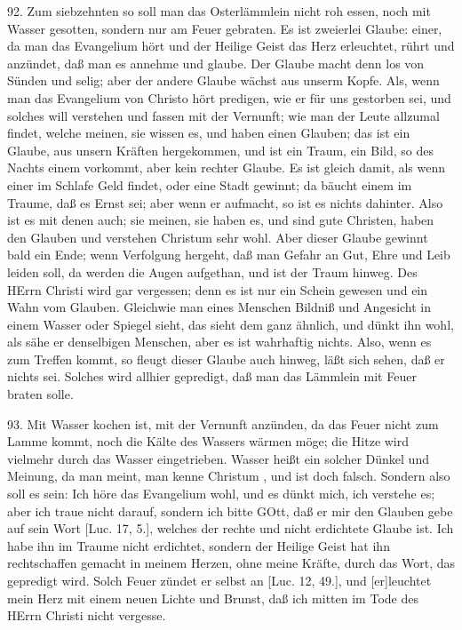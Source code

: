 92. Zum siebzehnten so soll man das Osterlämmlein nicht roh essen, noch mit Wasser gesotten, sondern nur am Feuer gebraten. Es ist zweierlei Glaube: einer, da man das Evangelium hört und der Heilige Geist das Herz erleuchtet, rührt und anzündet, daß man es annehme und glaube. Der Glaube macht denn los von Sünden und selig; aber der andere Glaube wächst aus unserm Kopfe. Als, wenn man das Evangelium von Christo hört predigen, wie er für uns gestorben sei, und solches will verstehen und fassen mit der Vernunft; wie man der Leute allzumal findet, welche meinen, sie wissen es, und haben einen Glauben; das ist ein Glaube, aus unsern Kräften hergekommen, und ist ein Traum, ein Bild, so des Nachts einem vorkommt, aber kein rechter Glaube. Es ist gleich damit, als wenn einer im Schlafe Geld findet, oder eine Stadt gewinnt; da bäucht einem im Traume, daß es Ernst sei; aber wenn er aufmacht, so ist es nichts dahinter. Also ist es mit denen auch; sie meinen, sie haben es, und sind gute Christen, haben den Glauben und verstehen Christum sehr wohl. Aber dieser Glaube gewinnt bald ein Ende; wenn Verfolgung hergeht, daß man Gefahr an Gut, Ehre und Leib leiden soll, da werden die Augen aufgethan, und ist der Traum hinweg. Des HErrn Christi wird gar vergessen; denn es ist nur ein Schein gewesen und ein Wahn vom Glauben. Gleichwie man eines Menschen Bildniß und Angesicht in einem Wasser oder Spiegel sieht, das sieht dem ganz ähnlich, und dünkt ihn wohl, als sähe er denselbigen Menschen, aber es ist wahrhaftig nichts. Also, wenn es zum Treffen kommt, so fleugt dieser Glaube auch hinweg, läßt sich sehen, daß er nichts sei. Solches wird allhier gepredigt, daß man das Lämmlein mit Feuer braten solle.

93. Mit Wasser kochen ist, mit der Vernunft anzünden, da das Feuer nicht zum Lamme kommt, noch die Kälte des Wassers wärmen möge; die Hitze wird vielmehr durch das Wasser eingetrieben. Wasser heißt ein solcher Dünkel und Meinung, da man meint, man kenne Christum
, und ist doch falsch. Sondern also soll es sein: Ich höre das Evangelium wohl, und es dünkt mich, ich verstehe es; aber ich traue nicht darauf, sondern ich bitte GOtt, daß er mir den Glauben gebe auf sein Wort [Luc. 17, 5.], welches der rechte und nicht erdichtete Glaube ist. Ich habe ihn im Traume nicht erdichtet, sondern der Heilige Geist hat ihn rechtschaffen gemacht in meinem Herzen, ohne meine Kräfte, durch das Wort, das gepredigt wird. Solch Feuer zündet er selbst an [Luc. 12, 49.], und [er]leuchtet mein Herz mit einem neuen Lichte und Brunst, daß ich mitten im Tode des HErrn Christi nicht vergesse.

